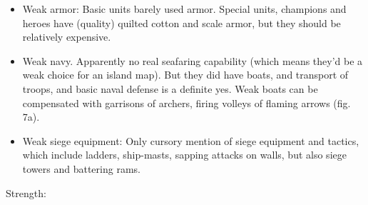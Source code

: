 \documentclass[a4paper,12pt]{scrreprt}
\begin{document}
\begin{itemize}
	\item Weak armor: Basic units barely used armor. Special units, champions and heroes have (quality) quilted cotton and scale armor, but they should be relatively expensive.
	\item Weak navy. Apparently no real seafaring capability (which means they’d be a weak choice for an island map). But they did have boats, and transport of troops, and basic naval defense is a definite yes. Weak boats can be compensated with garrisons of archers, firing volleys of flaming arrows (fig. 7a).
	\item Weak siege equipment: Only cursory mention of siege equipment and tactics, which include ladders, ship-masts, sapping attacks on walls, but also siege towers and battering rams.
\end{itemize}

Strength:
\end{document}
